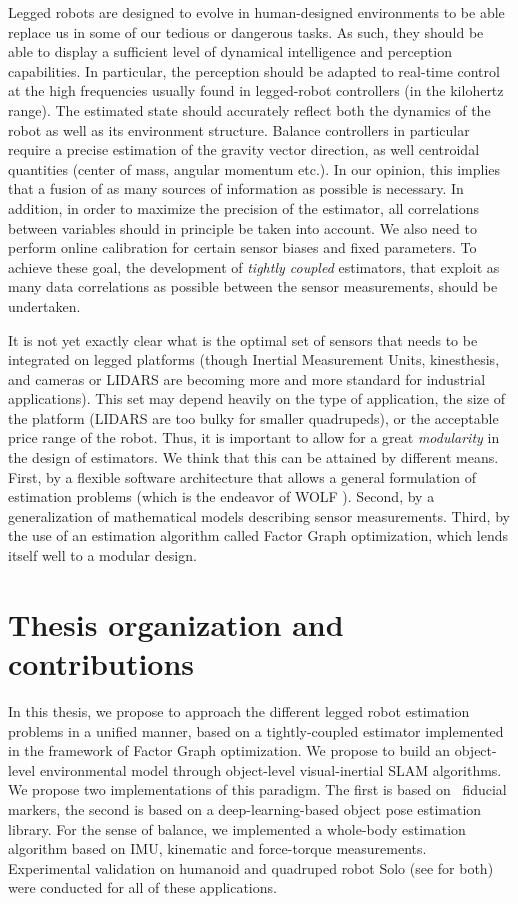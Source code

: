 Legged robots are designed to evolve in human-designed environments to be able replace us in some of our tedious or dangerous tasks. As such, they should be able to
display a sufficient level of dynamical intelligence and perception capabilities. 
In particular, the perception should be adapted to real-time control at the high frequencies usually found in legged-robot controllers (in the kilohertz range).
The estimated state should accurately reflect both the dynamics of the robot as well as its environment structure. Balance controllers in particular require a precise estimation of the gravity vector direction, as well centroidal quantities (center of mass, angular momentum etc.).
In our opinion, this implies that a fusion of as many sources of
information as possible is necessary. In addition, in order to maximize the precision of the estimator, all correlations between variables should in principle be taken into account. 
We also need to perform online calibration for certain sensor biases and fixed parameters. To achieve these goal, the development of \textit{tightly coupled} estimators, 
that exploit as many data correlations as possible between the sensor measurements, should be undertaken.

It is not yet exactly clear what is the optimal set of sensors that needs to be integrated on legged platforms (though Inertial Measurement Units, kinesthesis, and 
cameras or LIDARS are becoming more and more standard for industrial applications). This set may depend heavily on the type of application,
the size of the platform (LIDARS are too bulky for smaller quadrupeds), or the acceptable price range of the robot. Thus, it is important to allow
for a great \textit{modularity} in the design of estimators. We think that this can be attained by different means. First, by a flexible software architecture
that allows a general formulation of estimation problems (which is the endeavor of WOLF \cite{sola2021wolf}). Second, by a generalization of mathematical
models describing sensor measurements. Third, by the use of an estimation algorithm called Factor Graph optimization, which lends itself well to a modular design.


\section{Thesis organization and contributions}

In this thesis, we propose to approach the different legged robot estimation problems in a unified manner, based on a tightly-coupled estimator implemented in the framework of Factor Graph optimization.
We propose to build an object-level environmental model through object-level visual-inertial SLAM algorithms. We propose two implementations of this paradigm. 
The first is based on \apriltag\ fiducial markers, the second is based on a deep-learning-based object pose estimation library.   
For the sense of balance, we implemented a whole-body estimation algorithm based on IMU, kinematic and force-torque measurements.
Experimental validation on humanoid  and quadruped robot Solo (see  for both) were conducted for all of these applications.

